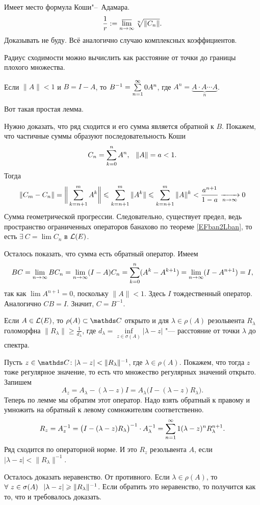 Имеет место формула Коши"--~Адамара.
\[
  \frac1r:= \varlimsup\limits_{n\to\infty} \sqrt[n]{\|C_n\|}.
\]
Доказывать не буду. Всё аналогично случаю комплексных коэффициентов.

Радиус сходимости можно вычислить как расстояние от точки до границы плохого множества.


\begin{Lem}
 Если $\|A\|<1$ и $B = I-A$, то $B^{-1} = \rY n0 A^n$, где $A^n = \underbrace{A\cdot A\cdots A}_{n}$.
\end{Lem}
Вот такая простая лемма.
\begin{Proof}
  Нужно доказать, что ряд сходится и его сумма является обратной к $B$. Покажем, что частичные суммы образуют последовательность Коши
\[
  C_n = \RY k0n A^n,\pau \|A\|=a<1.
\]
Тогда
\[
  \|C_m-C_n\| = \bigg\|\RY k{n+1}m A^k\bigg\|\le \RY k{n+1}m\|A^k\|\le
  \RY k{n+1}m\|A\|^k<\frac{a^{n+1}}{1-a}\te 0
\]
Сумма геометрической прогрессии. Следовательно, существует предел, ведь пространство ограниченных операторов банахово по теореме \ref{EFban2Lban}, то есть $\exists\ C = \lim C_n$ в $\L(E)$.

Осталось показать, что сумма есть обратный оператор. Имеем
\[
  BC = \yo n\infty BC_n = \yo n\infty(I-A)C_n = \RY k0n(A^k-A^{k+1})=
  \lim\limits_{n\to\infty} (I-A^{n+1}) = I,
\]
так как $\lim A^{n+1}=0$, поскольку $\|A\|<1$. Здесь $I$ тождественный оператор. Аналогично $CB = I$. Значит, $C = B^{-1}$.
\end{Proof}

\begin{The}[о резольвенте]\label{ores}
  Если $A\in\L(E)$, то $\rho(A)\subset \C$ открыто и для $\lambda\in\rho(A)$ резольвента $R_\lambda$ голоморфна $\|R_\lambda\|\ge\frac1{d_\lambda}$, где
$ d_\lambda = \inf\limits_{z\in \sigma(A)}|\lambda-z|$ "--- расстояние от точки $\lambda$ до спектра.
\end{The}
\begin{Proof}
  Пусть $z\in \C\colon |\lambda-z|<\|R_\lambda\|^{-1}$, где
  $\lambda\in\rho(A)$. Покажем, что тогда $z$ тоже регулярное значение, то есть что множество регулярных значений открыто. Запишем
  \[
    A_z = A_\lambda - (\lambda - z) I = A_\lambda\big(I-(\lambda-z)R_\lambda\big).
  \]
Теперь по лемме мы обратим этот оператор. Надо взять обратный к правому и умножить на обратный к левому сомножителям соответственно.
\[
  R_z = A^{-1}_z = \big(I-(\lambda-z)R_\lambda\big)^{-1} \cdot A^{-1}_\lambda = \rY n1(\lambda-z)^nR_\lambda^{n+1}.
\]
Ряд сходится по операторной норме. И это $R_z$ резольвента $A$, если $|\lambda-z|<\|R_\lambda\|^{-1}$.

Осталось доказать неравенство. От противного. Если $\lambda\in\rho(A)$, то $\forall\ z\in \sigma(A)\pau |\lambda-z|\ge \|R_\lambda\|^{-1} $. Если обратить это неравенство, то получится как то, что и требовалось доказать.
\end{Proof}

